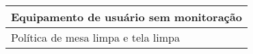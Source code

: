 \begin{table}[]
\begin{center}
\begin{tabular}{|l|}
Equipamento de usuário sem monitoração                                                                                                                                                                                       \\ \hline
Política de mesa limpa e tela limpa                                                                                                                                                                                          \\ \hline
\end{tabular}
\end{center}
\end{table}


